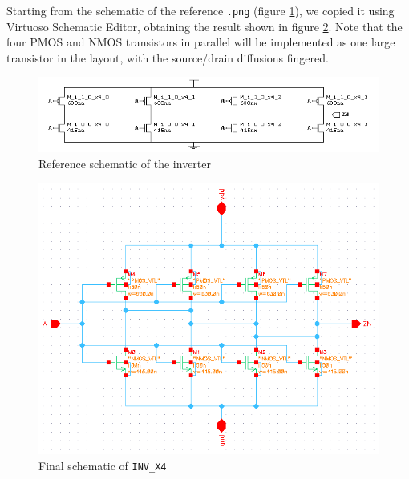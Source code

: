 \documentclass[a4paper]{article}
\newcommand{\inv}{\texttt{INV\_X4}\xspace}
\begin{document}
\label{sec: inv_sch}
Starting from the schematic of the reference \texttt{.png} (figure \ref{fig:inv_png}), we copied it using Virtuoso Schematic Editor, obtaining the result shown in figure \ref{fig:inv_schematic}. Note that the four PMOS and NMOS transistors in parallel will be implemented as one large transistor in the layout, with the source/drain diffusions fingered.
\begin{figure}[H]
	\centering
	\includegraphics[width=1\linewidth]{../INV_X4/INV_X4.png}
	\caption{Reference schematic of the inverter}
	\label{fig:inv_png}
\end{figure}
\begin{figure}[H]
	\centering
	\includegraphics[width=\linewidth]{../INV_X4/INV_X4_schematic.png}
	\caption{Final schematic of \inv}
	\label{fig:inv_schematic}
\end{figure}
\end{document}

